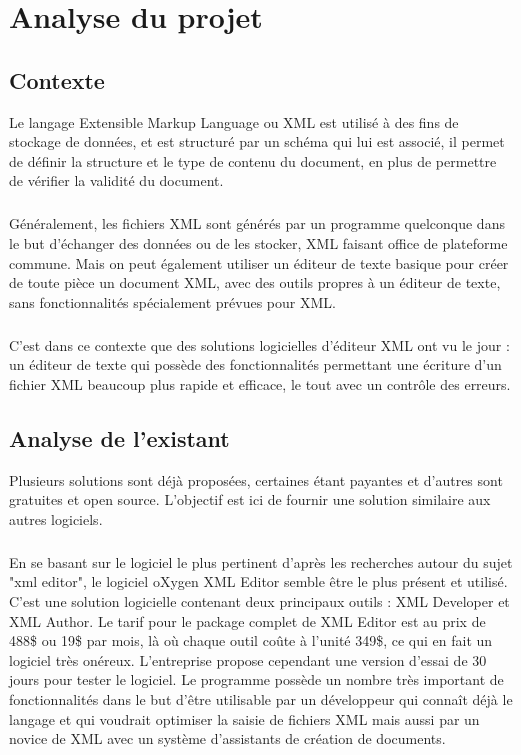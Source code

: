 \chapter{Analyse du projet}
\section{Contexte}
Le langage Extensible Markup Language ou XML est utilisé à des fins de stockage de données, et est structuré par un schéma qui lui est associé, il permet de définir la structure et le type de contenu du document, en plus de permettre de vérifier la validité du document.
\paragraph{}

Généralement, les fichiers XML sont générés par un programme quelconque dans le but d'échanger des données ou de les stocker, XML faisant office de plateforme commune. Mais on peut également utiliser un éditeur de texte basique pour créer de toute pièce un document XML, avec des outils propres à un éditeur de texte, sans fonctionnalités spécialement prévues pour XML.
\paragraph{}

C'est dans ce contexte que des solutions logicielles d'éditeur XML ont vu le jour : un éditeur de texte qui possède des fonctionnalités permettant une écriture d'un fichier XML beaucoup plus rapide et efficace, le tout avec un contrôle des erreurs.
	
\section{Analyse de l'existant}
Plusieurs solutions sont déjà proposées, certaines étant payantes et d'autres sont gratuites et open source. L'objectif est ici de fournir une solution similaire aux autres logiciels.
\paragraph{}

En se basant sur le logiciel le plus pertinent d'après les recherches autour du sujet "xml editor", le logiciel oXygen XML Editor semble être le plus présent et utilisé. C'est une solution logicielle contenant deux principaux outils : XML Developer et XML Author. Le tarif pour le package complet de XML Editor est au prix de 488\$ ou 19\$ par mois, là où chaque outil coûte à l'unité 349\$, ce qui en fait un logiciel très onéreux. L'entreprise propose cependant une version d'essai de 30 jours pour tester le logiciel. Le programme possède un nombre très important de fonctionnalités dans le but d'être utilisable par un développeur qui connaît déjà le langage et qui voudrait optimiser la saisie de fichiers XML mais aussi par un novice de XML avec un système d'assistants de création de documents.
